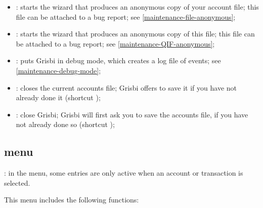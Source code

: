 \begin{itemize}
	\item {}: starts the wizard that produces an anonymous copy of your account file; this file can be attached to a bug report; see \vref{maintenance-file-anonymous};%
	\item {}: starts the wizard that produces an anonymous copy of this file; this file can be attached to a bug report; see \vref{maintenance-QIF-anonymous};%
	\item {}: puts Grisbi in debug mode, which creates a log file of events; see \vref{maintenance-debug-mode};%
	\item {}: closes the current accounts file; Grisbi offers to save it if you have not already done it (shortcut );%
	\item {}: close Grisbi; Grisbi will first ask you to save the accounts file, if you have not already done so (shortcut );%
\end{itemize}


\subsection{ menu\label{home-menus-edit}}

\Note{}: in the  menu, some entries are only active when an account or transaction is selected.

\vspace{2mm}
This menu includes the following functions:

